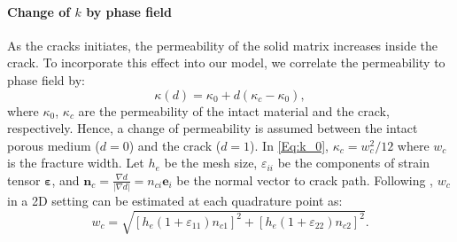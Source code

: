 \paragraph{Change of $k$ by phase field} As the cracks initiates, the permeability of the solid matrix increases inside the crack. To incorporate this effect into our model, 
we correlate the permeability to phase field by:
\begin{equation} \label{Eq:k_0}
\kappa(d)=\kappa_0+d\left(\kappa_c-\kappa_0 \right),
\end{equation}
where $\kappa_0$, $\kappa_c$ are the permeability of the intact material and the crack, respectively. Hence, a change of permeability is assumed between the intact porous medium ($d=0$) and the crack ($d=1$). In \eqref{Eq:k_0}, $\kappa_c={w_c^2}/{12}$ where $w_c$ is the fracture width.
Let $h_e$ be the mesh size, $\varepsilon_{ii}$ be the components of strain tensor $\bm{\varepsilon}$, and $\bm{n}_c=\frac{\nabla d}{|\nabla d|}=n_{ci}\bm{e}_i$ be the normal vector to crack path. Following \cite{heider2018modeling}, $w_c$ in a 2D setting can be estimated at each quadrature point as:
\begin{equation*}
w_c=\sqrt{\left[h_e\left(1+\varepsilon_{11}\right)n_{c1}\right]^2+\left[h_e\left(1+\varepsilon_{22}\right)n_{c2}\right]^2}.
\end{equation*}

